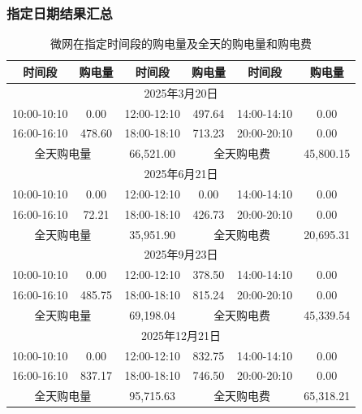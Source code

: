\documentclass[withoutpreface,bwprint]{cumcmthesis}
\begin{document}
\subsubsection{指定日期结果汇总}
\vspace*{-10pt}
\begin{table}[h!]
	\centering
	\footnotesize
	\renewcommand{\arraystretch}{1.2}
	\setlength{\tabcolsep}{15pt}
	\caption{微网在指定时间段的购电量及全天的购电量和购电费}
	\label{tab:q3_spec_1}
	\begin{tabular}{|c|c|c|c|c|c|}
		\hline
		时间段 & 购电量 & 时间段 & 购电量 & 时间段 & 购电量 \\ \hline
		\multicolumn{6}{|c|}{2025年3月20日} \\ \hline
		10:00-10:10 & 0.00 & 12:00-12:10 & 497.64 & 14:00-14:10 & 0.00 \\ \hline
		16:00-16:10 & 478.60 & 18:00-18:10 & 713.23 & 20:00-20:10 & 0.00 \\ \hline
		\multicolumn{2}{|c|}{全天购电量} & 66,521.00 & \multicolumn{2}{c|}{全天购电费} & 45,800.15 \\ \hline
		\multicolumn{6}{|c|}{2025年6月21日} \\ \hline
		10:00-10:10 & 0.00 & 12:00-12:10 & 0.00 & 14:00-14:10 & 0.00 \\ \hline
		16:00-16:10 & 72.21 & 18:00-18:10 & 426.73 & 20:00-20:10 & 0.00 \\ \hline
		\multicolumn{2}{|c|}{全天购电量} & 35,951.90 & \multicolumn{2}{c|}{全天购电费} & 20,695.31 \\ \hline
		\multicolumn{6}{|c|}{2025年9月23日} \\ \hline
		10:00-10:10 & 0.00 & 12:00-12:10 & 378.50 & 14:00-14:10 & 0.00 \\ \hline
		16:00-16:10 & 485.75 & 18:00-18:10 & 815.24 & 20:00-20:10 & 0.00 \\ \hline
		\multicolumn{2}{|c|}{全天购电量} & 69,198.04 & \multicolumn{2}{c|}{全天购电费} & 45,339.54 \\ \hline
		\multicolumn{6}{|c|}{2025年12月21日} \\ \hline
		10:00-10:10 & 0.00 & 12:00-12:10 & 832.75 & 14:00-14:10 & 0.00 \\ \hline
		16:00-16:10 & 837.17 & 18:00-18:10 & 746.50 & 20:00-20:10 & 0.00 \\ \hline
		\multicolumn{2}{|c|}{全天购电量} & 95,715.63 & \multicolumn{2}{c|}{全天购电费} & 65,318.21 \\ \hline
	\end{tabular}
\end{table}
\end{document}

